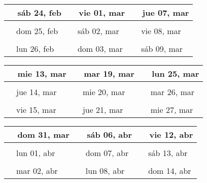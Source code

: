 \documentclass[letterpaper,10pt]{article}
\begin{document}
\begin{tabular}{lll}
\\
{\ \ sáb 24, feb\hspace{4.5cm}\vspace{2.25cm}} &{\ \ vie 01, mar\hspace{4.5cm}} &{\ \ jue 07, mar\hspace{4.5cm}}
\\ \hline \\
{\ \ dom 25, feb\vspace{2.25cm}} & {\ \ sáb 02, mar} & {\ \ vie 08, mar}
\\ \hline \\
{\ \ lun 26, feb\vspace{2.25cm}} & {\ \ dom 03, mar} & {\ \ sáb 09, mar}
\\
\end{tabular}\par
\begin{tabular}{lll}
\\
{\ \ mie 13, mar\hspace{4.5cm}\vspace{2.25cm}} &{\ \ mar 19, mar\hspace{4.5cm}} &{\ \ lun 25, mar\hspace{4.5cm}}
\\ \hline \\
{\ \ jue 14, mar\vspace{2.25cm}} & {\ \ mie 20, mar} & {\ \ mar 26, mar}
\\ \hline \\
{\ \ vie 15, mar\vspace{2.25cm}} & {\ \ jue 21, mar} & {\ \ mie 27, mar}
\\
\end{tabular}\par
\begin{tabular}{lll}
\\
{\ \ dom 31, mar\hspace{4.5cm}\vspace{2.25cm}} &{\ \ sáb 06, abr\hspace{4.5cm}} &{\ \ vie 12, abr\hspace{4.5cm}}
\\ \hline \\
{\ \ lun 01, abr\vspace{2.25cm}} & {\ \ dom 07, abr} & {\ \ sáb 13, abr}
\\ \hline \\
{\ \ mar 02, abr\vspace{2.25cm}} & {\ \ lun 08, abr} & {\ \ dom 14, abr}
\\
\end{tabular}\par
\end{document}
